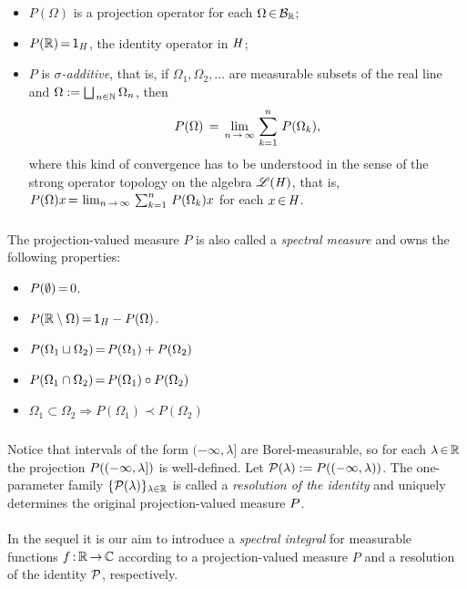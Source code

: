 \documentclass[11pt,twoside]{article}
\begin{document}
\begin{itemize}[leftmargin=12mm]
\item[(P-1)]
$P(\Omega)$ is a projection operator for each $\Omega \xeof \Borel{\R}$;

\item[(P-2)]
$P(\R) \eq \1_{\hilH}$, the identity operator in $\hilH$;

\item[(P-3)]
$P$ is \textit{$\sigma$-additive},
that is,
if $\Omega_1, \Omega_2,\ldots$ are measurable subsets of the real line
and $\Omega := \bigsqcup_{\,n \in \N} \Omega_n$,
then
\[
P(\Omega) \= \lim_{n \xto \infty} \, \sum_{k=1}^n \, P(\Omega_k),
\]
where this kind of convergence has to be understood
in the sense of the strong operator topology on the algebra $\BO{\hilH}$,
that is,
$P(\Omega) x \eq \lim_{n \xto \infty} \, \sum_{k=1}^n \, P(\Omega_k) x$
for each $x \xeof \hilH$.
\end{itemize}

\subparagraph{}
The projection-valued measure $P$ is also called
a \textit{spectral measure} and owns the following properties:

\begin{itemize}[leftmargin=12pt]
\item[1.]
$P(\emptyset) \eq 0$.
\item[2.]
$P(\R \setminus \Omega) \eq \1_{\hilH} - P(\Omega)$.
\item[3.]
$P(\Omega_1 \sqcup \Omega_2) \eq P(\Omega_1) + P(\Omega_2)$
\item[4.]
$P(\Omega_1 \cap \Omega_2) \eq P(\Omega_1) \circ P(\Omega_2)$
\item[5.]
$\Omega_1 \subset \Omega_2  \Longrightarrow P(\Omega_1) \prec P(\Omega_2)$
\end{itemize}

\subparagraph{}
Notice that
intervals of the form $(-\infty,\lambda]$ are Borel-measurable,
so for each $\lambda \xeof \R$ 
the projection $\linP((-\infty,\lambda])$ is well-defined.
Let $\cal{P}(\lambda) := P((-\infty,\lambda))$.
The one-parameter family $\{\cal{P}(\lambda)\}_{\lambda \in \R}$
is called a \textit{resolution of the identity}
and uniquely determines the original projection-valued measure $\linP$.

\paragraph{} %
In the sequel
it is our aim to introduce a \textit{spectral integral}
for measurable functions $f\:\R \xto \C$
according to a projection-valued measure $P$
and a resolution of the identity $\cal{P}$,
respectively.
\end{document}
